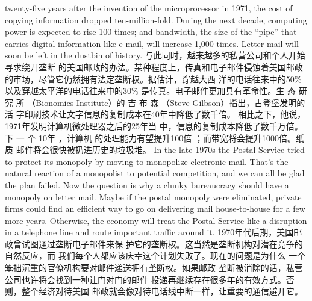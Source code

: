\begin{paracol}{2}
twenty-five years after the invention of the microprocessor in
1971, the cost of copying information dropped ten-million-fold. During the next decade, computing power is expected to
rise 100 times; and bandwidth, the size of the ``pipe'' that carries digital information like e-mail, will increase 1,000 times.
Letter mail will soon be left in the dustbin of history.
\switchcolumn
与此同时，越来越多的私营公司和个人开始寻求绕开垄断
的美国邮政的办法。某种程度上，传真和电子邮件侵蚀着美国邮政的市场，尽管它仍然拥有法定垄断权。据估计，穿越大西
洋的电话往来中的50\%以及穿越太平洋的电话往来中的30\%
是传真。电子邮件更加具有革命性。生 态 研 究 所 （Bionomics
Institute）的 吉 布 森 （Steve Gilbson）指出，古登堡发明的活
字印刷技术让文字信息的复制成本在40年中降低了数千倍。
相比之下，他说，1971年发明计算机微处理器之后的25年当
中，信息的复制成本降低了数千万倍。下 一 个 10年 ，计算机
的处理能力有望提升100倍 ；而带宽将会提升1000倍。纸质
邮件将会很快被扔进历史的垃圾堆。
\switchcolumn*
In the late 1970s the Postal Service tried to protect its monopoly by moving to monopolize electronic mail. That's the natural reaction of a monopolist to potential competition, and
we can all be glad the plan failed. Now the question is why a
clunky bureaucracy should have a monopoly on letter mail.
Maybe if the postal monopoly were eliminated, private firms
could find an efficient way to go on delivering mail house-to-house for a few more years. Otherwise, the economy will treat
the Postal Service like a disruption in a telephone line and route
important traffic around it.
\switchcolumn
1970年代后期，美国邮政曾试图通过垄断电子邮件来保
护它的垄断权。这当然是垄断机构对潜在竞争的自然反应，而
我们每个人都应该庆幸这个计划失败了。现在的问题是为什么
一个笨拙沉重的官僚机构要对邮件递送拥有垄断权。如果邮政
垄断被消除的话，私营公司也许将会找到一种让门对门的邮件
投递再继续存在很多年的有效方式。否则，整个经济对待美国
邮政就会像对待电话线中断一样，让重要的通信避开它。


\end{paracol}

